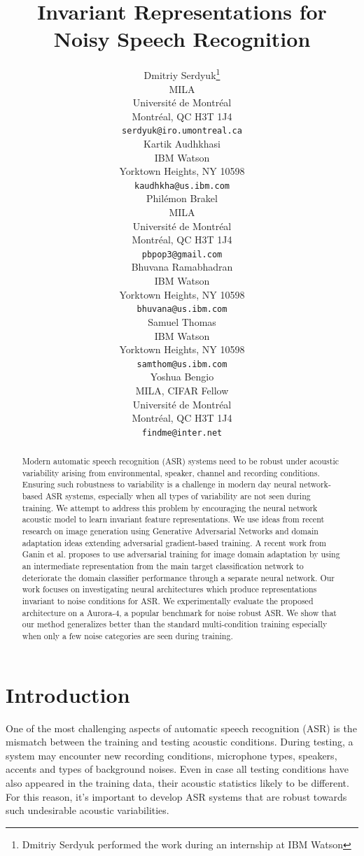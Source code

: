 \documentclass{article}
\title{Invariant Representations for Noisy Speech Recognition}
\author{
  Dmitriy Serdyuk\thanks{Dmitriy Serdyuk performed the work 
    during an internship at IBM Watson} \\
  MILA\\
  Universit\'e de Montr\'eal\\
  Montr\'eal, QC H3T 1J4 \\
  \texttt{serdyuk@iro.umontreal.ca} \\
  \And
  Kartik Audhkhasi \\
  IBM Watson \\
  Yorktown Heights, NY 10598\\
  \texttt{kaudhkha@us.ibm.com} \\
  \And
  Phil\'emon Brakel \\
  MILA\\
  Universit\'e de Montr\'eal\\
  Montr\'eal, QC H3T 1J4 \\
  \texttt{pbpop3@gmail.com} \\
  \And
  Bhuvana Ramabhadran\\
  IBM Watson\\
  Yorktown Heights, NY 10598\\
  \texttt{bhuvana@us.ibm.com} \\
  \And
  Samuel Thomas\\
  IBM Watson\\
  Yorktown Heights, NY 10598\\
  \texttt{samthom@us.ibm.com} \\
  \And
  Yoshua Bengio\\
  MILA, CIFAR Fellow\\
  Universit\'e de Montr\'eal\\
  Montr\'eal, QC H3T 1J4 \\
  \texttt{findme@inter.net} \\
}
\begin{document}
%
\maketitle
%
\begin{abstract}
    Modern automatic speech recognition (ASR) systems need to be robust under acoustic variability arising from environmental, speaker, channel and recording conditions. Ensuring such robustness to variability is a challenge in modern day neural network-based ASR systems, especially when all types of variability are not seen during training. We attempt to address this problem by encouraging the neural network acoustic model to learn invariant feature representations.
    We use ideas from recent research on image generation using
    Generative Adversarial Networks and domain adaptation ideas extending
    adversarial gradient-based training. A recent work from Ganin et al. proposes to
    use adversarial training for image domain adaptation by using an intermediate
    representation from the main target classification network to deteriorate the domain 
    classifier performance through a separate neural network.
    Our work focuses on investigating neural architectures which produce
    representations invariant to noise conditions for ASR.  We
    experimentally evaluate the proposed architecture on a Aurora-4, a popular benchmark for
    noise robust ASR. We show that our method generalizes better than the standard multi-condition training especially when only a few noise categories are seen during training.
\end{abstract}
%
%
\section{Introduction}
\label{sec:intro}
    One of the most challenging aspects of automatic speech recognition (ASR)
    is the mismatch between the training and testing acoustic conditions. During
    testing, a system may encounter new recording conditions, microphone types, speakers,
    accents and types of background noises. Even in case all testing conditions have also appeared
    in the training data, their acoustic statistics likely to be
    different. For this reason, it's important to develop ASR systems that are
    robust towards such undesirable acoustic variabilities.
\end{document}
